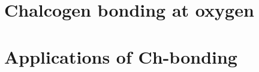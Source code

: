 \documentclass[a4paper, 12pt]{Thesis}  %
\begin{document}
\part{Chalcogen bonding at oxygen}



\part{Applications of Ch-bonding}











\appendix %




\backmatter


\end{document}
